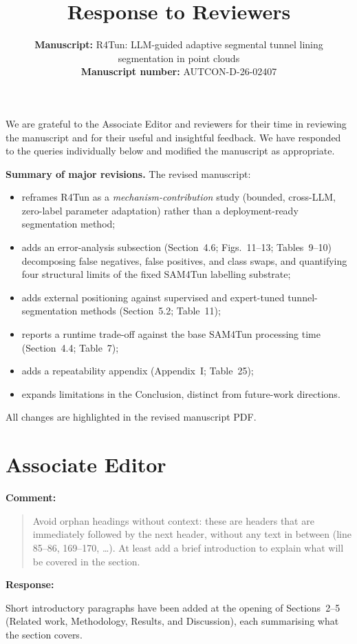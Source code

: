 \documentclass[11pt,a4paper]{article}
\title{Response to Reviewers}
\author{%
  \parbox{\textwidth}{%
    \textbf{Manuscript:} R4Tun: LLM-guided adaptive segmental tunnel lining segmentation in point clouds\\[0.4em]
    \textbf{Manuscript number:} AUTCON-D-26-02407
  }%
}
\date{}
\newenvironment{commentblock}{%
  \par\smallskip\noindent\textbf{Comment:}\par
  \begin{quote}\itshape\color{black}
}{%
  \end{quote}\smallskip
}
\newenvironment{responseblock}{%
  \par\smallskip\noindent\textbf{Response:}\par
  \begingroup\color{responsegreen}
}{%
  \endgroup\smallskip
}
\begin{document}
\maketitle

We are grateful to the Associate Editor and reviewers for their time in reviewing the manuscript and for their useful and insightful feedback. We have responded to the queries individually below and modified the manuscript as appropriate.

\medskip
\noindent\textbf{Summary of major revisions.} The revised manuscript:
\begin{itemize}[nosep]
  \item reframes R4Tun as a \emph{mechanism-contribution} study (bounded, cross-LLM, zero-label parameter adaptation) rather than a deployment-ready segmentation method;
  \item adds an error-analysis subsection (Section~4.6; Figs.~11--13; Tables~9--10) decomposing false negatives, false positives, and class swaps, and quantifying four structural limits of the fixed SAM4Tun labelling substrate;
  \item adds external positioning against supervised and expert-tuned tunnel-segmentation methods (Section~5.2; Table~11);
  \item reports a runtime trade-off against the base SAM4Tun processing time (Section~4.4; Table~7);
  \item adds a repeatability appendix (Appendix~I; Table~25);
  \item expands limitations in the Conclusion, distinct from future-work directions.
\end{itemize}
\noindent All changes are highlighted in the revised manuscript PDF.

\section*{Associate Editor}

\begin{commentblock}
Avoid orphan headings without context: these are headers that are immediately followed by the next header, without any text in between (line 85--86, 169--170, \ldots). At least add a brief introduction to explain what will be covered in the section.
\end{commentblock}
\begin{responseblock}
Short introductory paragraphs have been added at the opening of Sections~2--5 (Related work, Methodology, Results, and Discussion), each summarising what the section covers.
\end{responseblock}
\end{document}
